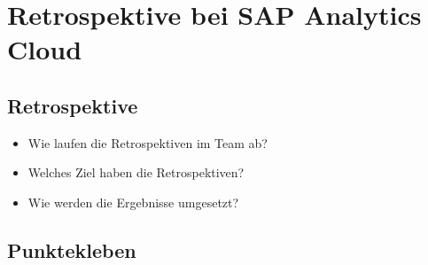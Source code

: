 \section{Retrospektive bei SAP Analytics Cloud}\label{sec:retro}

\subsection{Retrospektive}
\begin{itemize}
    \item Wie laufen die Retrospektiven im Team ab?
    \item Welches Ziel haben die Retrospektiven?
    \item Wie werden die Ergebnisse umgesetzt? 
\end{itemize}

\subsection{Punktekleben}